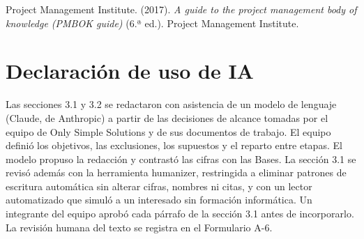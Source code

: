 \documentclass[11pt]{article}
\begin{document}
Project Management Institute. (2017). \textit{A guide to the project management body of knowledge (PMBOK guide)} (6.ª ed.). Project Management Institute.

\section*{Declaración de uso de IA}

Las secciones 3.1 y 3.2 se redactaron con asistencia de un modelo de lenguaje (Claude, de Anthropic) a partir de las decisiones de alcance tomadas por el equipo de Only Simple Solutions y de sus documentos de trabajo. El equipo definió los objetivos, las exclusiones, los supuestos y el reparto entre etapas. El modelo propuso la redacción y contrastó las cifras con las Bases. La sección 3.1 se revisó además con la herramienta humanizer, restringida a eliminar patrones de escritura automática sin alterar cifras, nombres ni citas, y con un lector automatizado que simuló a un interesado sin formación informática. Un integrante del equipo aprobó cada párrafo de la sección 3.1 antes de incorporarlo. La revisión humana del texto se registra en el Formulario A-6.

\ossFinalPage
\end{document}
